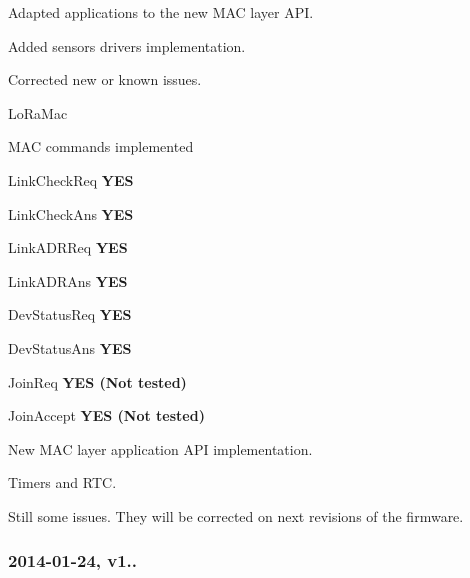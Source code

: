 \begin{DoxyItemize}
\begin{DoxyEnumerate}
\begin{DoxyItemize}
\end{DoxyItemize}
\item Adapted applications to the new M\+AC layer A\+PI.
\item Added sensors drivers implementation.
\item Corrected new or known issues.
\end{DoxyEnumerate}
\item Lo\+Ra\+Mac
\begin{DoxyEnumerate}
\item M\+AC commands implemented
\begin{DoxyItemize}
\item Link\+Check\+Req {\bfseries Y\+ES}
\item Link\+Check\+Ans {\bfseries Y\+ES}
\item Link\+A\+D\+R\+Req {\bfseries Y\+ES}
\item Link\+A\+D\+R\+Ans {\bfseries Y\+ES}
\item Dev\+Status\+Req {\bfseries Y\+ES}
\item Dev\+Status\+Ans {\bfseries Y\+ES}
\item Join\+Req {\bfseries Y\+ES (Not tested)}
\item Join\+Accept {\bfseries Y\+ES (Not tested)}
\end{DoxyItemize}
\item New M\+AC layer application A\+PI implementation.
\end{DoxyEnumerate}
\item Timers and R\+TC.
\begin{DoxyEnumerate}
\item Still some issues. They will be corrected on next revisions of the firmware.
\end{DoxyEnumerate}
\end{DoxyItemize}

\subsubsection*{2014-\/01-\/24, v1..}


